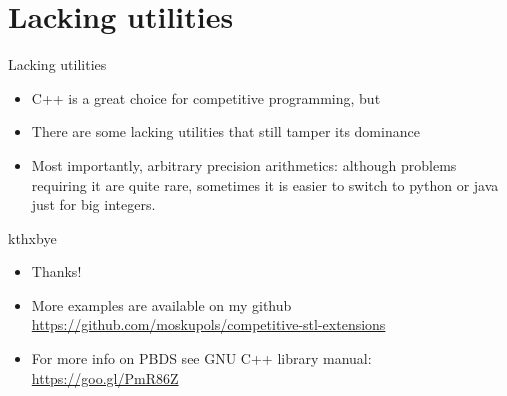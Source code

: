 \documentclass[12pt,presentation,hyperref={unicode},aspectratio=169]{beamer}
\begin{document}
\section{Lacking utilities}

\begin{frame}{Lacking utilities}
  \begin{itemize}
    \item<1-> C++ is a great choice for competitive programming, but
    \item<2-> There are some lacking utilities that still tamper its dominance
    \item<3-> Most importantly, arbitrary precision arithmetics:
      although problems requiring it are quite rare, sometimes it is easier to
      switch to python or java just for big integers.
  \end{itemize}
\end{frame}

\begin{frame}{kthxbye}
  \begin{itemize}
    \item Thanks!
    \item More examples are available on my github
      \url{https://github.com/moskupols/competitive-stl-extensions}
    \item For more info on PBDS see GNU C++ library manual:
      \url{https://goo.gl/PmR86Z}
  \end{itemize}
\end{frame}
\end{document}
